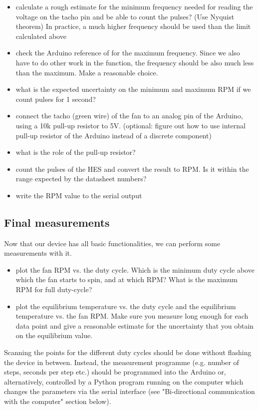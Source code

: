 \begin{itemize}
	\item calculate a rough estimate for the minimum frequency needed for reading the voltage on the tacho pin and be able to count the pulses? (Use Nyquist theorem) In practice, a much higher frequency should be used than the limit calculated above
	\item check the Arduino reference of  for the maximum frequency. Since we also have to do other work in the  function, the frequency should be also much less than the maximum. Make a reasonable choice.
    \item what is the expected uncertainty on the minimum and maximum RPM if we count pulses for 1 second?
	\item connect the tacho (green wire) of the fan to an analog pin of the Arduino, using a 10k pull-up resistor to 5V. (optional: figure out how to use internal pull-up resistor of the Arduino instead of a discrete component)
	\item what is the role of the pull-up resistor?
	\item count the pulses of the HES and convert the result to RPM. Is it within the range expected by the datasheet numbers?
	\item write the \ac{RPM} value to the serial output
\end{itemize}

\subsection{Final measurements}
Now that our device has all basic functionalities, we can perform some measurements with it.
\begin{itemize}
	\item plot the fan RPM vs. the duty cycle. Which is the minimum duty cycle above which the fan starts to spin, and at which RPM? What is the maximum RPM for full duty-cycle?
	\item plot the equilibrium temperature vs. the duty cycle and the equilibrium temperature vs. the fan RPM. Make sure you measure long enough for each data point and give a reasonable estimate for the uncertainty that you obtain on the equilibrium value.
\end{itemize}

Scanning the points for the different duty cycles should be done without flashing the device in between. Instead, the measurement programme (e.g. number of steps, seconds per step etc.) should be programmed into the Arduino or, alternatively, controlled by a Python program running on the computer which changes the parameters via the serial interface (see "Bi-directional communication with the computer" section below).

